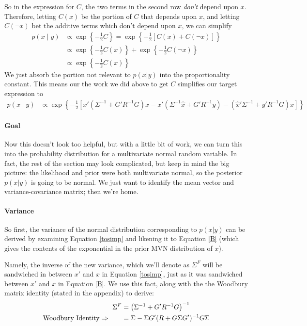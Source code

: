 \documentclass[a4paper,12pt]{article}
\begin{document}
So in the expression for $C$, the two terms
in the second row \emph{don't} depend upon $x$. Therefore,
letting $C(x)$ be the portion of $C$ that depends upon
$x$, and letting $C(\lnot x)$ bet the additive terms which
don't depend upon $x$, we can simplify
\begin{align*}
    p(x\; | \; y) &\propto \exp\left\{ -\frac{1}{2}
	C \right\} = \exp\left\{ -\frac{1}{2}
	\left[C(x) + C(\lnot x) \right]\right\}  \\
    &\propto \exp\left\{ -\frac{1}{2}
	C(x)\right\} +  \exp\left\{ -\frac{1}{2} C(\lnot x) 
	\right\}  \\
    &\propto \exp\left\{ -\frac{1}{2}
	C(x)\right\}
\end{align*}
We just absorb the portion not relevant to $p(x|y)$ into
the proportionality constant.  This means our the work we
did above to get $C$ simplifies our target expression to
\begin{align}
    p(x\;|\;y) &\propto \exp\left\{-\frac{1}{2} \left[
	x' \left( \Sigma^{-1} + G'R^{-1}G\right) x 
	- x' (\Sigma^{-1} \hat{x} + G'R^{-1}y)
	- (\hat{x}' \Sigma^{-1} + y' R^{-1}G) x  \right]\right\}
	\label{tosimp}
\end{align}
\paragraph{Goal}
Now this doesn't look too helpful, but with a little bit of 
work, we can turn this into the probability distribution
for a multivariate normal random variable. 
In fact, the rest of the section may look complicated, but
keep in mind the big picture: the likelihood and prior
were both multivariate normal, so 
the posterior $p(x|y)$ is going to be normal. We just want
to identify the mean vector and variance-covariance matrix;
then we're home.

\paragraph{Variance} So first, the {variance} of the 
normal distribution corresponding to $p(x|y)$ can
be derived by examining Equation \ref{tosimp} and likening
it to Equation \ref{B} (which gives the contents of the 
exponential in the prior MVN distribution of $x$).  

Namely, the inverse of the new variance,
which we'll denote as $\Sigma^F$ will be sandwiched in 
between $x'$ and $x$ in Equation \ref{tosimp}, just as it 
was sandwiched between $x'$ and $x$ in Equation \ref{B}.
We use this fact, along with the 
the Woodbury matrix identity (stated in 
the appendix) to derive:
\begin{align}
    \Sigma^{F} &= \left( \Sigma^{-1} + G'R^{-1}G\right)^{-1} 
	\notag \\
    \text{Woodbury Identity} \Rightarrow
	\qquad &=  \Sigma - \Sigma G'(R 
	    + G\Sigma G')^{-1}
	    G\Sigma
	    \label{covar}
\end{align}
\end{document}

